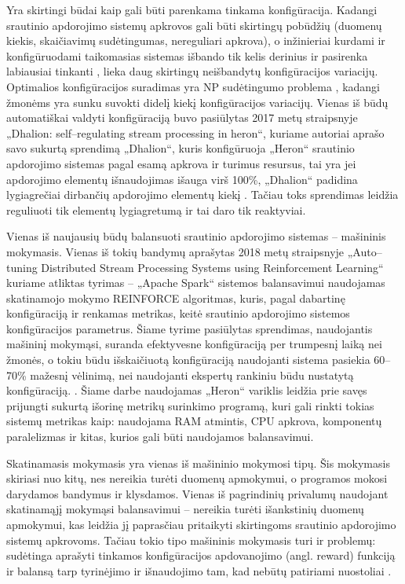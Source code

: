 \documentclass{VUMIFPSbakalaurinis}
\begin{document}
Yra skirtingi būdai kaip gali būti parenkama tinkama konfigūracija. Kadangi srautinio apdorojimo sistemų apkrovos gali būti skirtingų pobūdžių (duomenų kiekis, skaičiavimų sudėtingumas, nereguliari apkrova), o inžinieriai kurdami ir konfigūruodami taikomasias sistemas išbando tik kelis derinius ir pasirenka labiausiai tinkanti \cite{selfRegulatingStreaming}, lieka daug skirtingų neišbandytų konfigūracijos variacijų. Optimalios konfigūracijos suradimas yra NP sudėtingumo problema \cite{automateTuning}, kadangi žmonėms yra sunku suvokti didelį kiekį konfigūracijos variacijų. 
Vienas iš būdų automatiškai valdyti konfigūraciją buvo pasiūlytas 2017 metų straipsnyje „Dhalion: self–regulating stream processing in heron“, kuriame autoriai aprašo savo sukurtą sprendimą „Dhalion“, kuris konfigūruoja „Heron“ srautinio apdorojimo sistemas pagal esamą apkrova ir turimus resursus, tai yra jei apdorojimo elementų išnaudojimas išauga virš 100\%, „Dhalion“ padidina lygiagrečiai dirbančių apdorojimo elementų kiekį \cite{dhalion}. Tačiau toks sprendimas leidžia reguliuoti tik elementų lygiagretumą ir tai daro tik reaktyviai.

Vienas iš naujausių būdų balansuoti srautinio apdorojimo sistemas – mašininis mokymasis. Vienas iš tokių bandymų aprašytas 2018 metų straipsnyje „Auto–tuning Distributed Stream Processing Systems using Reinforcement Learning“\cite{vaquero2018autotuning} kuriame atliktas tyrimas – „Apache Spark“ sistemos balansavimui naudojamas skatinamojo mokymo REINFORCE algoritmas, kuris, pagal dabartinę konfigūraciją ir renkamas metrikas, keitė srautinio apdorojimo sistemos konfigūracijos parametrus. Šiame tyrime pasiūlytas sprendimas, naudojantis mašininį mokymąsi, suranda efektyvesne konfigūraciją per trumpesnį laiką nei žmonės, o tokiu būdu išskaičiuotą konfigūraciją naudojanti sistema pasiekia 60–70\% mažesnį vėlinimą, nei naudojanti ekspertų rankiniu būdu nustatytą konfigūraciją. \cite{vaquero2018autotuning}. Šiame darbe naudojamas „Heron“ variklis leidžia prie savęs prijungti sukurtą išorinę metrikų surinkimo programą, kuri gali rinkti tokias sistemų metrikas kaip: naudojama RAM atmintis, CPU apkrova, komponentų paralelizmas ir kitas, kurios gali būti naudojamos balansavimui. 

Skatinamasis mokymasis yra vienas iš mašininio mokymosi tipų. Šis mokymasis skiriasi nuo kitų, nes nereikia turėti duomenų apmokymui, o programos mokosi darydamos bandymus ir klysdamos. Vienas iš pagrindinių privalumų naudojant skatinamąjį mokymąsi balansavimui – nereikia turėti išankstinių duomenų apmokymui, kas leidžia jį paprasčiau pritaikyti skirtingoms srautinio apdorojimo sistemų apkrovoms. Tačiau tokio tipo mašininis mokymasis turi ir problemų: sudėtinga aprašyti tinkamos konfigūracijos apdovanojimo (angl. reward) funkciją ir balansą tarp tyrinėjimo ir išnaudojimo tam, kad nebūtų patiriami nuostoliai \cite{selfRegulatingStreaming}.
\end{document}
